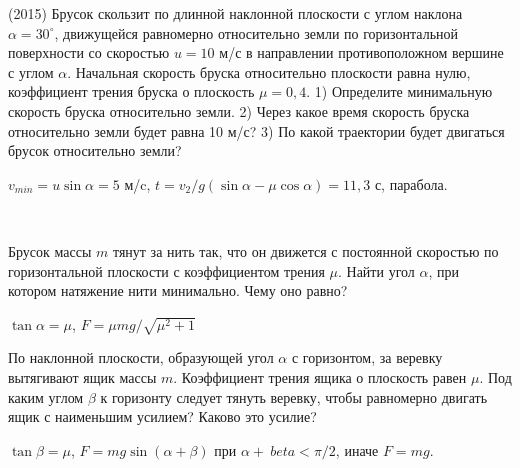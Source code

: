 \begin{ex}
(2015) Брусок скользит по длинной наклонной плоскости с углом наклона $\alpha = 30^{\circ}$, движущейся равномерно относительно земли по горизонтальной поверхности со скоростью $u = 10$ м/с в направлении противоположном вершине с углом $\alpha$. Начальная скорость бруска относительно плоскости равна нулю, коэффициент трения бруска о плоскость $\mu = 0,4$. 1) Определите минимальную скорость бруска относительно земли. 2) Через какое время скорость бруска относительно земли будет равна 10 м/с? 3) По какой траектории будет двигаться брусок относительно земли?
\begin{ans}
$v_{min} = u \sin \alpha = 5$ м/c, $t = v_2/g(\sin \alpha - \mu \cos \alpha) = 11,3$ с, парабола.
\end{ans}
\end{ex}

\begin{ex}
\hspace{0pt} \\
\begin{minipage}{.65\textwidth}
Брусок массы $m$ тянут за нить так, что он движется с постоянной скоростью по
горизонтальной плоскости с коэффициентом трения $\mu$. Найти угол $\alpha$, при котором натяжение нити минимально. Чему оно равно?
\end{minipage}
\begin{minipage}{.35\textwidth}
\centering

\end{minipage}
\begin{ans}
$\tan \alpha = \mu$, $F = \mu mg / \sqrt{\mu^2 + 1}$
\end{ans}
\end{ex}

\begin{ex}
По наклонной плоскости, образующей угол $\alpha$ с горизонтом, за веревку вытягивают ящик массы $m$. 
Коэффициент трения ящика о плоскость равен $\mu$. Под каким углом $\beta$ к горизонту следует тянуть веревку, 
чтобы равномерно двигать ящик с наименьшим усилием? Каково это усилие?
\begin{ans}
$\tan \beta = \mu$, $F = mg \sin (\alpha + \beta)$ при $\alpha + \ beta < \pi/2$, иначе $F = mg$.
\end{ans}
\end{ex}

